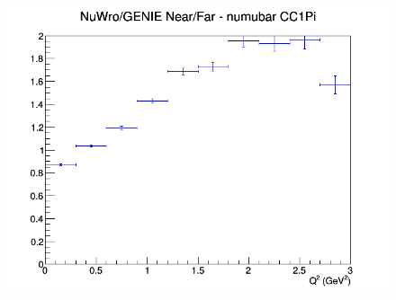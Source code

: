 \documentclass[12pt]{article}
\begin{document}
\begin{figure}[h]
\endminipage
{}
\includegraphics[width=\linewidth]{Q2/nominal/ratios/CC1Pi_NuWro_GENIE_numubar_NF_Q2.png}
\endminipage
\newline
\end{figure}
\clearpage
\end{document}
